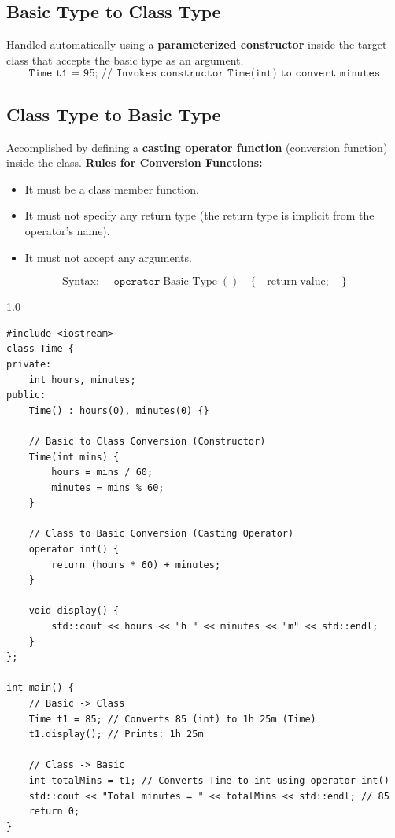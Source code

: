 \documentclass[12pt,a4paper]{article}
\begin{document}
\subsection{Basic Type to Class Type}
Handled automatically using a \textbf{parameterized constructor} inside the target class that accepts the basic type as an argument.
\begin{equation}
  \texttt{Time t1 = 95; // Invokes constructor Time(int) to convert minutes}
\end{equation}

\subsection{Class Type to Basic Type}
Accomplished by defining a \textbf{casting operator function} (conversion function) inside the class.
\textbf{Rules for Conversion Functions:}
\begin{itemize}[leftmargin=*, itemsep=2pt]
  \item It must be a class member function.
  \item It must not specify any return type (the return type is implicit from the operator's name).
  \item It must not accept any arguments.
\end{itemize}
\begin{equation}
  \text{Syntax: } \quad \texttt{operator}\;\text{Basic\_Type}\;() \quad \{ \quad \text{return}\;\text{value}; \quad \}
\end{equation}

\begin{tcolorbox}[examplebox, title={Code Example: Basic-to-Class and Class-to-Basic conversions}]
\begin{spacing}{1.0}
\begin{verbatim}
#include <iostream>
class Time {
private:
    int hours, minutes;
public:
    Time() : hours(0), minutes(0) {}
    
    // Basic to Class Conversion (Constructor)
    Time(int mins) {
        hours = mins / 60;
        minutes = mins % 60;
    }
    
    // Class to Basic Conversion (Casting Operator)
    operator int() {
        return (hours * 60) + minutes;
    }
    
    void display() {
        std::cout << hours << "h " << minutes << "m" << std::endl;
    }
};

int main() {
    // Basic -> Class
    Time t1 = 85; // Converts 85 (int) to 1h 25m (Time)
    t1.display(); // Prints: 1h 25m

    // Class -> Basic
    int totalMins = t1; // Converts Time to int using operator int()
    std::cout << "Total minutes = " << totalMins << std::endl; // 85
    return 0;
}
\end{verbatim}
\end{spacing}
\end{tcolorbox}
\end{document}
